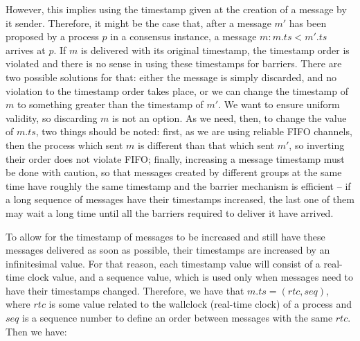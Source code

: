 \documentclass[times, 10pt]{article}
\begin{document}
However, this implies using the timestamp given at the creation of a message by it sender. Therefore, it might be the case that, after a message $m'$ has been proposed by a process $p$ in a consensus instance, a message $m : m.ts < m'.ts$ arrives at $p$. If $m$ is delivered with its original timestamp, the timestamp order is violated and there is no sense in using these timestamps for barriers. There are two possible solutions for that: either the message is simply discarded, and no violation to the timestamp order takes place, or we can change the timestamp of $m$ to something greater than the timestamp of $m'$. We want to ensure uniform validity, so discarding $m$ is not an option. As we need, then, to change the value of $m.ts$, two things should be noted: first, as we are using reliable FIFO channels, then the process which sent $m$ is different than that which sent $m'$, so inverting their order does not violate FIFO; finally, increasing a message timestamp must be done with caution, so that messages created by different groups at the same time have roughly the same timestamp and the barrier mechanism is efficient -- if a long sequence of messages have their timestamps increased, the last one of them may wait a long time until all the barriers required to deliver it have arrived.


To allow for the timestamp of messages to be increased and still have these messages delivered as soon as possible, their timestamps are increased by an infinitesimal value. For that reason, each timestamp value will consist of a real-time clock value, and a sequence value, which is used only when messages need to have their timestamps changed. Therefore, we have that $m.ts = (rtc, seq)$, where $rtc$ is some value related to the wallclock (real-time clock) of a process and $seq$ is a sequence number to define an order between messages with the same $rtc$. Then we have:
\end{document}
